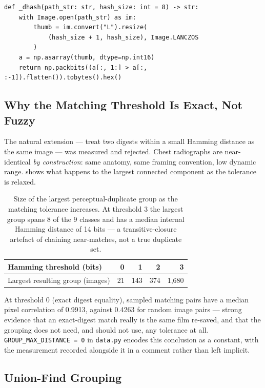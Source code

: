 \documentclass[11pt,a4paper,oneside]{report}
\newcommand{\code}[1]{\texttt{\small #1}}
\begin{document}
\begin{lstlisting}[caption={The difference hash (\texttt{lxnet/data.py}).},
label=lst:dhash]
def _dhash(path_str: str, hash_size: int = 8) -> str:
    with Image.open(path_str) as im:
        thumb = im.convert("L").resize(
            (hash_size + 1, hash_size), Image.LANCZOS
        )
    a = np.asarray(thumb, dtype=np.int16)
    return np.packbits((a[:, 1:] > a[:, :-1]).flatten()).tobytes().hex()
\end{lstlisting}

\subsection{Why the Matching Threshold Is Exact, Not Fuzzy}

The natural extension --- treat two digests within a small Hamming distance
as the same image --- was measured and rejected. Chest radiographs are
near-identical \emph{by construction}: same anatomy, same framing convention,
low dynamic range.  shows what happens to the largest
connected component as the tolerance is relaxed.

\begin{table}[h]
\centering
\small
\begin{tabular}{@{}lrrrr@{}}
\toprule
\textbf{Hamming threshold (bits)} & 0 & 1 & 2 & 3 \\
\midrule
Largest resulting group (images) & 21 & 143 & 374 & 1{,}680 \\
\bottomrule
\end{tabular}
\caption{Size of the largest perceptual-duplicate group as the matching
tolerance increases. At threshold 3 the largest group spans 8 of the 9
classes and has a median internal Hamming distance of 14 bits --- a
transitive-closure artefact of chaining near-matches, not a true duplicate
set.}
\label{tab:hamming}
\end{table}

At threshold 0 (exact digest equality), sampled matching pairs have a median
pixel correlation of 0.9913, against 0.4263 for random image pairs ---
strong evidence that an exact-digest match really is the same film re-saved,
and that the grouping does not need, and should not use, any tolerance at
all. \code{GROUP\_MAX\_DISTANCE = 0} in \code{data.py} encodes this
conclusion as a constant, with the measurement recorded alongside it in a
comment rather than left implicit.

\subsection{Union-Find Grouping}
\end{document}
